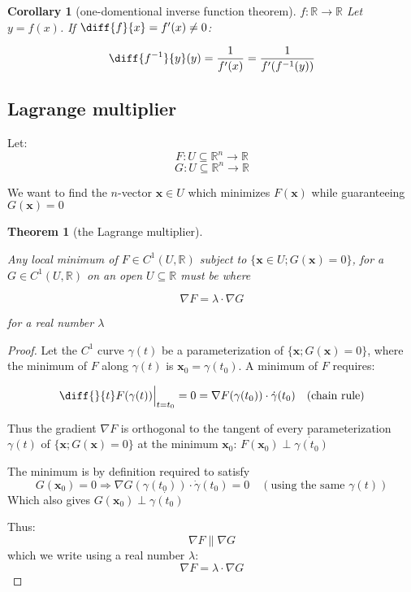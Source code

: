 \documentclass{article}
\theoremstyle{plain}
\newtheorem{theorem}{Theorem}
\newtheorem{corollary}{Corollary}
\begin{document}
\begin{corollary}[one-domentional inverse function theorem]
    $f: \mathbb R \rightarrow \mathbb R$
    Let $y = f(x)$. If $\diff{f}{x} = f'(x) \neq 0$:

    $$\diff{f^{-1}}{y}(y) = \frac{1}{f'(x)} = \frac{1}{f'(f^{-1}(y))}$$
    
\end{corollary}



\subsection{Lagrange multiplier}

Let:
$$F: U \subseteq \mathbb R^n \rightarrow \mathbb R$$
$$G: U \subseteq \mathbb R^n \rightarrow \mathbb R$$

We want to find the $n$-vector $\mathbf x \in U$ which minimizes $F(\mathbf x)$
while guaranteeing $G(\mathbf x) = 0$

\begin{theorem}[the Lagrange multiplier]
\label{th:lagrangem}

    Any local minimum of $F \in C^1(U, \mathbb R)$ subject to 
    $\{ \mathbf x  \in U; G(\mathbf x) = 0\}$, for a $G \in C^1(U, \mathbb R)$
    on an open $U \subseteq \mathbb R$
    must be where

    \begin{equation}\label{eq:lagrangem}
        \nabla F = \lambda \cdot \nabla G
    \end{equation}
    

    for a real number $\lambda$
    
\end{theorem}

\begin{proof}
    Let the $C^1$ curve $\gamma(t)$ be a parameterization of $\{\mathbf x; G(\mathbf x) = 0 \}$, where the minimum of $F$ along $\gamma(t)$ is $\mathbf x_0 = \gamma(t_0)$.   
    A minimum of $F$ requires:

    $$\diff{}{t} F(\gamma(t)) \Big |_{t = t_0}= 0 = \nabla F(\gamma(t_0)) \cdot \dot{\gamma}(t_0) \quad \textrm{(chain rule)}$$

    Thus the gradient $\nabla F$ is orthogonal to the tangent of 
    every parameterization $\gamma(t)$ of $\{\mathbf x; G(\mathbf x) = 0 \}$
    at the minimum $\mathbf x_0$: $F(\mathbf x_0) \perp \dot{\gamma(t_0)}$

    The minimum is by definition required to satisfy
    $$G(\mathbf x_0) = 0 \Rightarrow \nabla G(\gamma(t_0)) \cdot \dot{\gamma}(t_0) = 0 \quad (\textrm{using the same } \gamma(t))$$
    Which also gives $G(\mathbf x_0) \perp \dot{\gamma(t_0)}$

    Thus:
    $$\nabla F \parallel \nabla G$$
    which we write using a real number $\lambda$:
    $$\nabla F = \lambda \cdot \nabla G$$



\end{proof}
\end{document}
